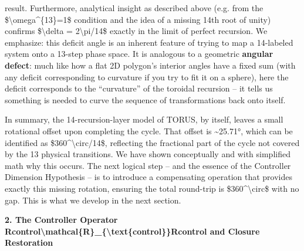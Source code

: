 \documentclass[]{article}
\begin{document}
result. Furthermore, analytical insight as described above (e.g. from
the \$\textbackslash{}omega\^{}\{13\}=1\$ condition and the idea of a
missing 14th root of unity) confirms \$\textbackslash{}delta =
2\textbackslash{}pi/14\$ exactly in the limit of perfect recursion. We
emphasize: this deficit angle is an inherent feature of trying to map a
14-labeled system onto a 13-step phase space. It is analogous to a
geometric \textbf{angular defect}: much like how a flat 2D polygon's
interior angles have a fixed sum (with any deficit corresponding to
curvature if you try to fit it on a sphere), here the deficit
corresponds to the ``curvature'' of the toroidal recursion -- it tells
us something is needed to curve the sequence of transformations back
onto itself.

In summary, the 14-recursion-layer model of TORUS, by itself, leaves a
small rotational offset upon completing the cycle. That offset is
\textasciitilde{}25.71°, which can be identified as
\$360\^{}\textbackslash{}circ/14\$, reflecting the fractional part of
the cycle not covered by the 13 physical transitions. We have shown
conceptually and with simplified math why this occurs. The next logical
step -- and the essence of the Controller Dimension Hypothesis -- is to
introduce a compensating operation that provides exactly this missing
rotation, ensuring the total round-trip is
\$360\^{}\textbackslash{}circ\$ with no gap. This is what we develop in
the next section.

\textbf{2. The Controller Operator
Rcontrol\textbackslash{}mathcal\{R\}\_\{\textbackslash{}text\{control\}\}Rcontrol​
and Closure Restoration}
\end{document}
